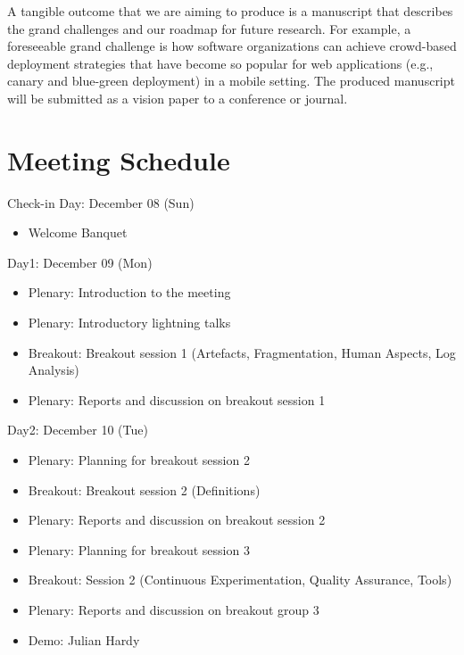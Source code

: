 \documentclass[a4paper]{article}
\begin{document}
A tangible outcome that we are aiming to produce is a manuscript that describes the grand challenges and our roadmap for future research.
For example, a foreseeable grand challenge is how software organizations can achieve crowd-based deployment strategies that have become so popular for web applications (e.g., canary and blue-green deployment) in a mobile setting.
The produced manuscript will be submitted as a vision paper to a conference or journal.

\clearpage

\section{Meeting Schedule}

\begin{bfseries}
Check-in Day: December 08 (Sun)
\end{bfseries}
\begin{itemize}
\item Welcome Banquet
\end{itemize}
\begin{bfseries}
{Day1: December 09 (Mon)}
\end{bfseries}
\begin{itemize}
\item Plenary: Introduction to the meeting
\item Plenary: Introductory lightning talks
\item Breakout: Breakout session 1 (Artefacts, Fragmentation, Human Aspects, Log Analysis)
\item Plenary: Reports and discussion on breakout session 1
\end{itemize}
\begin{bfseries}
Day2: December 10 (Tue)
\end{bfseries}
\begin{itemize}
\item Plenary: Planning for breakout session 2 
\item Breakout: Breakout session 2 (Definitions)
\item Plenary: Reports and discussion on breakout session 2
\item Plenary: Planning for breakout session 3
\item Breakout: Session 2 (Continuous Experimentation, Quality Assurance, Tools)
\item Plenary: Reports and discussion on breakout group 3
\item Demo: Julian Hardy
\end{itemize}
\end{document}
